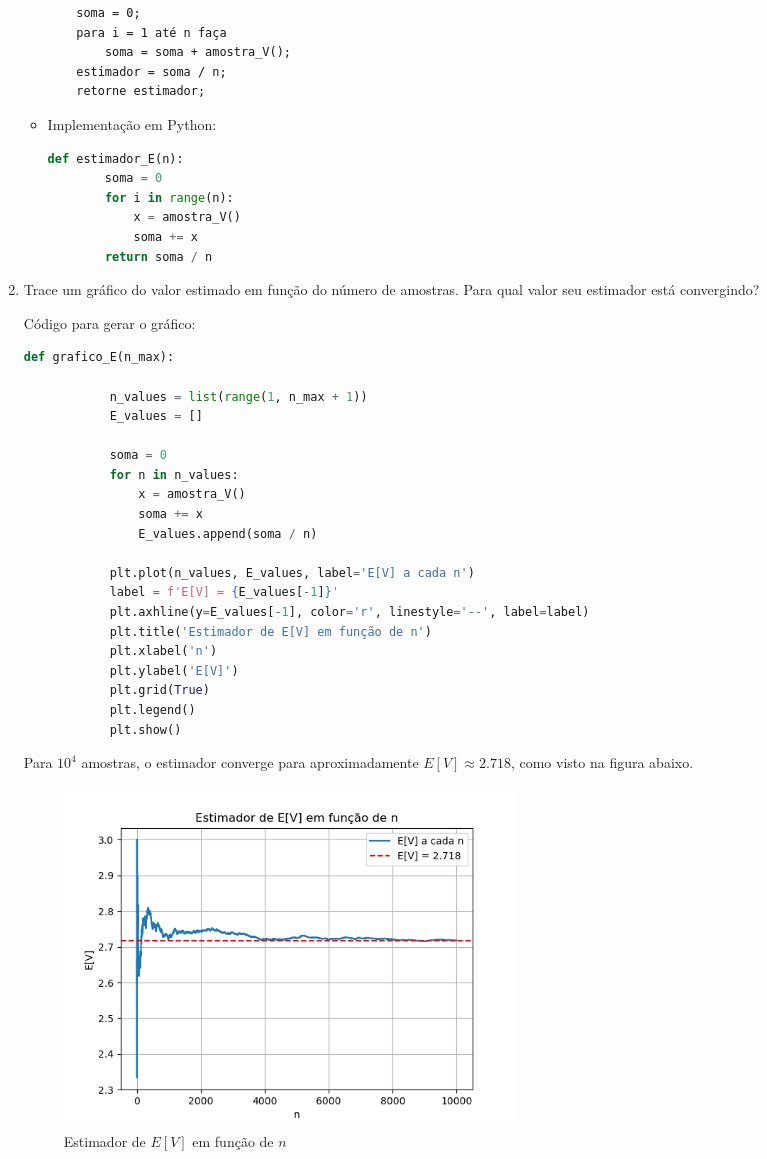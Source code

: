 \documentclass[12 pt]{article}
\begin{document}
\begin{enumerate}
\begin{tcolorbox}[colframe=black, title=Resposta:]
\begin{itemize}
\begin{verbatim}
    soma = 0;
    para i = 1 até n faça
        soma = soma + amostra_V();
    estimador = soma / n;
    retorne estimador;
            \end{verbatim}
            \item Implementação em Python:
            \begin{lstlisting}[language=Python]
    def estimador_E(n):
        soma = 0
        for i in range(n):
            x = amostra_V()
            soma += x
        return soma / n
            \end{lstlisting}
        \end{itemize}
    \end{tcolorbox}
    \newpage
    \item Trace um gráfico do valor estimado em função do número de amostras. Para qual valor seu estimador está convergindo?
    \begin{tcolorbox}[colframe=black, title=Resposta:]
        Código para gerar o gráfico:
        \begin{lstlisting}[language=Python]
        def grafico_E(n_max):
    
            n_values = list(range(1, n_max + 1))
            E_values = []
        
            soma = 0
            for n in n_values:
                x = amostra_V()
                soma += x
                E_values.append(soma / n)
        
            plt.plot(n_values, E_values, label='E[V] a cada n')
            label = f'E[V] = {E_values[-1]}'
            plt.axhline(y=E_values[-1], color='r', linestyle='--', label=label)
            plt.title('Estimador de E[V] em função de n')
            plt.xlabel('n')
            plt.ylabel('E[V]')
            plt.grid(True)
            plt.legend()
            plt.show()
        \end{lstlisting}
        Para $10^4$ amostras, o estimador converge para aproximadamente $E[V] \approx 2.718$, como visto na figura abaixo.
    \end{tcolorbox}

    \begin{figure}[H]
        \centering
        \includegraphics[width=0.6\textwidth]{q5_3.png}
        \caption{Estimador de $E[V]$ em função de $n$}
        \label{fig:estimador_E}
    \end{figure}
\end{enumerate}
\end{document}
